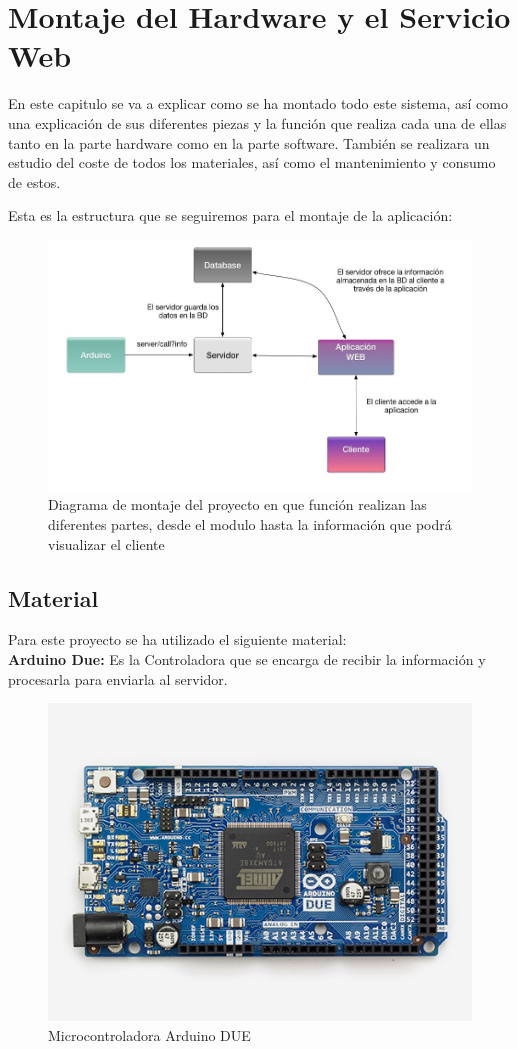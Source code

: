 
\chapter{Montaje del Hardware y el Servicio Web}

\setlength{\parindent}{5ex}En este capitulo se va a explicar como se ha montado todo este sistema, así como una explicación de sus diferentes piezas y la función que realiza cada una de ellas tanto en la parte hardware como en la parte software.
También se realizara un estudio del coste de todos los materiales, así como el mantenimiento y consumo de estos.

\setlength{\parindent}{0ex}Esta es la estructura que se seguiremos para el montaje de la aplicación:

\begin{figure}[!h]
	\centering
	\includegraphics[width=0.9\linewidth]{figuras/montage1}
	\caption{Diagrama de montaje del proyecto en que función realizan las diferentes partes, desde el modulo hasta la información que podrá visualizar el cliente}
	\label{fig:imgmontage1}
\end{figure}



\section{Material}

\setlength{\parindent}{0ex}Para este proyecto se ha utilizado el siguiente material:\\

\textbf{Arduino Due:} Es la Controladora que se encarga de recibir la información y procesarla para enviarla al servidor.

\begin{figure}[!h]
	\centering
	\includegraphics[width=0.4\linewidth]{figuras/arddue}
	\caption{Microcontroladora Arduino DUE}
	\label{fig:imgdue}
\end{figure}

